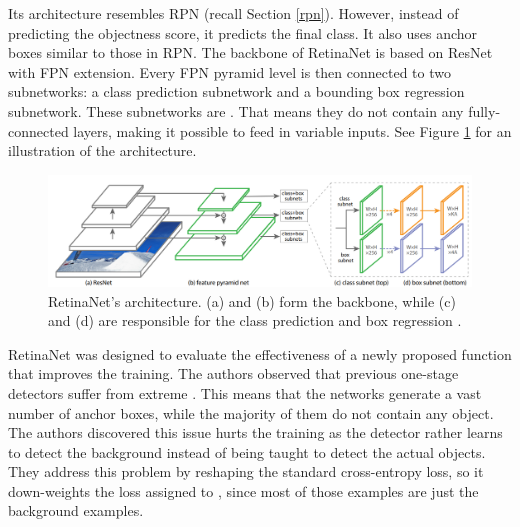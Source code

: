 Its architecture resembles RPN (recall Section \ref{rpn}). However, instead of predicting the objectness score, it predicts the final class. It also uses anchor boxes similar to those in RPN. The backbone of RetinaNet is based on ResNet with FPN extension. Every FPN pyramid level is then connected to two subnetworks: a class prediction subnetwork and a bounding box regression subnetwork. These subnetworks are . That means they do not contain any fully-connected layers, making it possible to feed in variable inputs. See Figure \ref{fig:retinanet} for an illustration of the architecture.

\begin{figure}[h]
    \centering
    \includegraphics[width=\linewidth]{Sources/Figures/retinanet.png}
    \caption{RetinaNet's architecture. (a) and (b) form the backbone, while (c) and (d) are responsible for the class prediction and box regression \cite{retinanet}.}
    \label{fig:retinanet}
\end{figure}

RetinaNet was designed to evaluate the effectiveness of a newly proposed  function that improves the training. The authors observed that previous one-stage detectors \cite{yolo1, yolo2, ssd} suffer from extreme . This means that the networks generate a vast number of anchor boxes, while the majority of them do not contain any object. The authors discovered this issue hurts the training as the detector rather learns to detect the background instead of being taught to detect the actual objects. They address this problem by reshaping the standard cross-entropy loss, so it down-weights the loss assigned to , since most of those examples are just the background examples.


